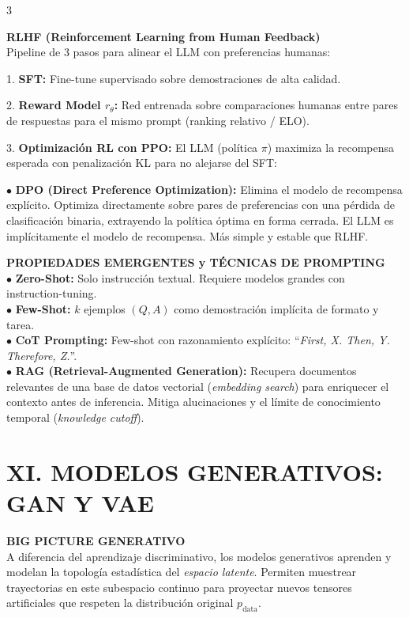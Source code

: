 \documentclass[8pt,a4paper,landscape,fleqn]{extarticle}
\begin{document}
\begin{multicols*}{3}
\vspace{-2pt}

 
\textbf{RLHF (Reinforcement Learning from Human Feedback)}\\
Pipeline de 3 pasos para alinear el LLM con preferencias humanas:
 
1. \textbf{SFT:} Fine-tune supervisado sobre demostraciones de alta calidad.

2. \textbf{Reward Model $r_\theta$:} Red entrenada sobre comparaciones humanas entre pares de respuestas para el mismo prompt (ranking relativo / ELO).

3. \textbf{Optimización RL con PPO:} El LLM (política $\pi$) maximiza la recompensa esperada con penalización KL para no alejarse del SFT:

 
$\bullet$ \textbf{DPO (Direct Preference Optimization):} Elimina el modelo de recompensa explícito. Optimiza directamente sobre pares de preferencias con una pérdida de clasificación binaria, extrayendo la política óptima en forma cerrada. El LLM es implícitamente el modelo de recompensa. Más simple y estable que RLHF.
 

 
\textbf{PROPIEDADES EMERGENTES y TÉCNICAS DE PROMPTING}\\

 
$\bullet$ \textbf{Zero-Shot:} Solo instrucción textual. Requiere modelos grandes con instruction-tuning.\\
$\bullet$ \textbf{Few-Shot:} $k$ ejemplos $(Q,A)$ como demostración implícita de formato y tarea.\\
$\bullet$ \textbf{CoT Prompting:} Few-shot con razonamiento explícito: ``\textit{First, X. Then, Y. Therefore, Z.}''.\\
$\bullet$ \textbf{RAG (Retrieval-Augmented Generation):} Recupera documentos relevantes de una base de datos vectorial (\textit{embedding search}) para enriquecer el contexto antes de inferencia. Mitiga alucinaciones y el límite de conocimiento temporal (\textit{knowledge cutoff}).   




\section{XI. MODELOS GENERATIVOS: GAN Y VAE}

\textbf{BIG PICTURE GENERATIVO}\\
A diferencia del aprendizaje discriminativo, los modelos generativos aprenden y modelan la topología estadística del \textit{espacio latente}. Permiten muestrear trayectorias en este subespacio continuo para proyectar nuevos tensores artificiales que respeten la distribución original $p_{\text{data}}$.


\end{multicols*}
\end{document}
